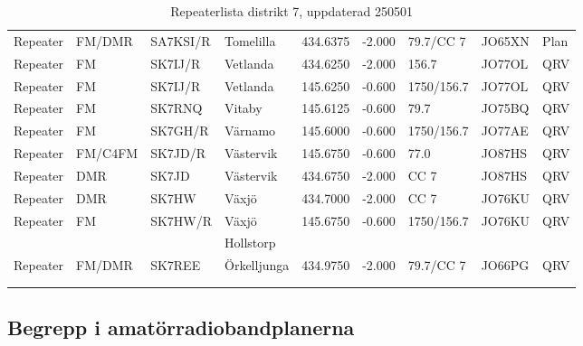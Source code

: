 \begin{longtable}{llllrrlll}
Repeater & FM/DMR          & SA7KSI/R & Tomelilla    & 434.6375     & -2.000     & 79.7/CC 7    & JO65XN      & Plan     \\
Repeater & FM              & SK7IJ/R  & Vetlanda     & 434.6250     & -2.000     & 156.7        & JO77OL      & QRV      \\
Repeater & FM              & SK7IJ/R  & Vetlanda     & 145.6250     & -0.600     & 1750/156.7   & JO77OL      & QRV      \\
Repeater & FM              & SK7RNQ   & Vitaby       & 145.6125     & -0.600     & 79.7         & JO75BQ      & QRV      \\
Repeater & FM              & SK7GH/R  & Värnamo      & 145.6000     & -0.600     & 1750/156.7   & JO77AE      & QRV      \\
Repeater & FM/C4FM         & SK7JD/R  & Västervik    & 145.6750     & -0.600     & 77.0         & JO87HS      & QRV      \\
Repeater & DMR             & SK7JD    & Västervik    & 434.6750     & -2.000     & CC 7         & JO87HS      & QRV      \\
Repeater & DMR             & SK7HW    & Växjö        & 434.7000     & -2.000     & CC 7         & JO76KU      & QRV      \\
Repeater & FM              & SK7HW/R  & Växjö        & 145.6750     & -0.600     & 1750/156.7   & JO76KU      & QRV      \\
         &                 &          & Hollstorp    &              &            &              &             &          \\
Repeater & FM/DMR          & SK7REE   & Örkelljunga  & 434.9750     & -2.000     & 79.7/CC 7    & JO66PG      & QRV      \\
\vspace{1 ex}                                                                                                            \\
\caption{Repeaterlista distrikt 7, uppdaterad 250501}                                                                    \\
\end{longtable}

\normalsize

\clearpage

\subsection{Begrepp i amatörradiobandplanerna}

